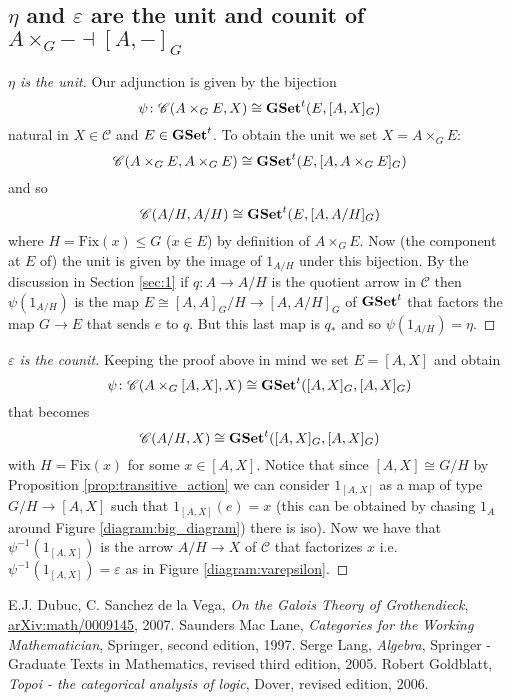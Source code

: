 \documentclass[italian, 12pt, reqno]{article}
\theoremstyle{myteo}
\numberwithin{equation}{section}
\newcommand{\cat}[1]{\mathscr{#1}}
\newcommand{\tgset}{\text{\textbf{GSet}}^t}
\newcommand{\homs}[2]{[#1, #2]}
\newcommand{\fun}[3]{#1\colon#2\to #3}
\begin{document}
\subsection{\(\eta\) and \(\varepsilon\) are the unit and counit of \(A\times_G- \dashv \homs{A}{-}_G\)}

\begin{proof}[\(\eta\) is the unit]
  Our adjunction is given by the bijection
  \[\psi\colon\cat{C}(A\times_G E, X)\cong\tgset(E, \homs{A}{X}_G)\]
  natural in \(X\in\cat{C}\) and \(E\in\tgset\).
  To obtain the unit we set \(X = A\times_G E\):
  \[\cat{C}(A\times_G E, A\times_G E)\cong\tgset(E, \homs{A}{A\times_G E}_G)\]
  and so
  \[\cat{C}(A/H, A/H)\cong\tgset(E, \homs{A}{A/H}_G)\]
  where \(H = \text{Fix}(x)\leq G\) (\(x\in E\)) by definition of \(A\times_G E\).
  Now (the component at \(E\) of) the unit is given by the image of \(1_{A/H}\) under this bijection.
  By the discussion in Section \ref{sec:1} if \(\fun{q}{A}{A/H}\) is the quotient arrow in \(\cat{C}\) then \(\psi(1_{A/H})\) is the map \(E\cong\homs{A}{A}_G/H \to \homs{A}{A/H}_G\) of \(\tgset\) that factors the map \(G\to E\) that sends \(e\) to \(q\).
  But this last map is \(q_*\) and so \(\psi(1_{A/H}) = \eta\).
\end{proof}

\begin{proof}[\(\varepsilon\) is the counit]
  Keeping the proof above in mind we set \(E = \homs{A}{X}\) and obtain
  \[\psi\colon \cat{C}(A\times_G\homs{A}{X}, X) \cong \tgset(\homs{A}{X}_G, \homs{A}{X}_G)\]
  that becomes
  \[\cat{C}(A/H, X) \cong \tgset(\homs{A}{X}_G, \homs{A}{X}_G)\]
  with \(H = \text{Fix}(x)\) for some \(x\in\homs{A}{X}\).
  Notice that since \(\homs{A}{X}\cong G/H\) by Proposition \ref{prop:transitive_action} we can consider \(1_{\homs{A}{X}}\) as a map of type \(G/H \to \homs{A}{X}\) such that \(1_{\homs{A}{X}}(e) = x\) (this can be obtained by chasing \(1_A\) around Figure \ref{diagram:big_diagram}) there is iso).
  Now we have that \(\psi^{-1}(1_{\homs{A}{X}})\) is the arrow \(A/H\to X\) of \(\cat{C}\) that factorizes \(x\) i.e. \(\psi^{-1}(1_{\homs{A}{X}}) = \varepsilon\) as in Figure \ref{diagram:varepsilon}.
\end{proof}

\begin{thebibliography}{1}
	E.J. Dubuc, C. Sanchez de la Vega,
  \textit{On the Galois Theory of Grothendieck},
  \href{https://arxiv.org/abs/math/0009145}{arXiv:math/0009145},
  2007.
  Saunders Mac Lane,
  \textit{Categories for the Working Mathematician},
  Springer,
  second edition,
  1997.
  Serge Lang,
  \textit{Algebra},
  Springer - Graduate Texts in Mathematics,
  revised third edition,
  2005.
  Robert Goldblatt,
  \textit{Topoi - the categorical analysis of logic},
  Dover,
  revised edition,
  2006.
\end{thebibliography}
\end{document}
